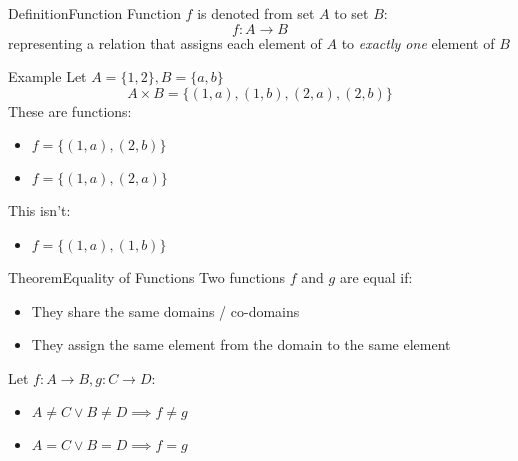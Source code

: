 \documentclass{MathNotes}
\newenvironment{example}[1]{\begin{BlueBox}{Example}{#1}}{\end{BlueBox}}
\newenvironment{definition}[1]{\begin{RedBox}{Definition}{#1}}{\end{RedBox}}
\newenvironment{theorem}[1]{\begin{GrayBox}{Theorem}{#1}}{\end{GrayBox}}
\begin{document}
\begin{multicols}{2}
	\begin{definition}{Function}\label{def:function}
		Function $f$ is denoted from set $A$ to set $B$:
		\[f:A\to B\]
		representing a relation that assigns each element of $A$ to \textit{exactly one} element
		of $B$
	\end{definition}

	\begin{example}{}\label{ex:functions}
		Let $A=\{1,2\},B=\{a,b\}$\[A\times B=\{(1,a),(1,b),(2,a),(2,b)\}\]
		These are functions:
		\begin{itemize}
			\item $f=\{(1,a),(2,b)\}$
			\item $f=\{(1,a),(2,a)\}$
		\end{itemize}
		This isn't:
		\begin{itemize}
			\item $f=\{(1,a),(1,b)\}$
		\end{itemize}
	\end{example}
\end{multicols}

\begin{theorem}{Equality of Functions}
	Two functions $f$ and $g$ are equal if:
	\begin{itemize}
		\item They share the same domains / co-domains
		\item They assign the same element from the domain to the same element
	\end{itemize}
	Let $f:A\to B,g:C\to D$:
	\begin{itemize}
		\item $A\neq C\lor B\neq D\implies f\neq g$
		\item $A=C\lor B=D\implies f=g$
	\end{itemize}
\end{theorem}
\end{document}
